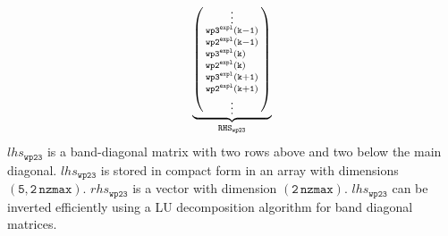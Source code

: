 \documentclass[11pt,fleqn]{article}
\begin{document}
\begin{equation}
\begin{split}
\underbrace{
\left( \begin{smallmatrix}
  \hfill \vdots \hfill \\
  \mathtt{ wp3^{expl}(k-1) } \\
  \mathtt{ wp2^{expl}(k-1) } \\
  \mathtt{ wp3^{expl}(k)\phantom{+0} } \\
  \mathtt{ wp2^{expl}(k)\phantom{+0} } \\
  \mathtt{ wp3^{expl}(k+1) } \\
  \mathtt{ wp2^{expl}(k+1) } \\
  \hfill \vdots \hfill
\end{smallmatrix} \right) }_{ \mathtt{RHS}_{\mathtt{wp23}}}
\end{split}
\end{equation}
%
$lhs_{\mathtt{wp23}}$ is a band-diagonal matrix with two rows above and two below 
the main diagonal. $lhs_{\mathtt{wp23}}$ is stored in compact form in an array 
with dimensions $\mathtt{(5,2\,nzmax)}$. $rhs_{\mathtt{wp23}}$ is a vector 
with dimension $\mathtt{(2\,nzmax)}$. $lhs_{\mathtt{wp23}}$ can be inverted 
efficiently using a LU decomposition algorithm for band diagonal matrices.
\end{document}
